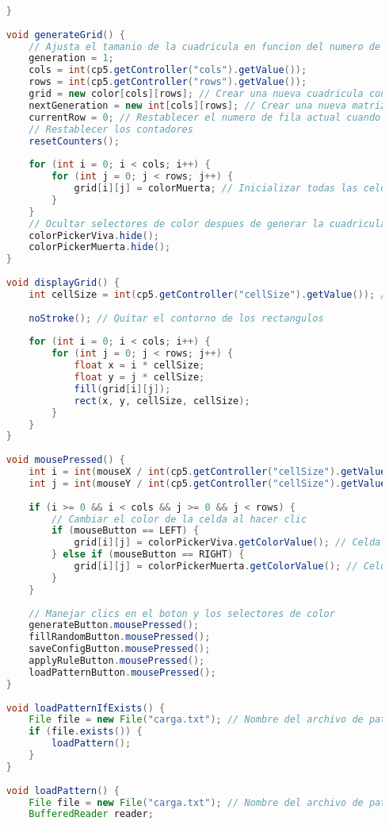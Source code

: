 \documentclass{article}
\begin{document}
\begin{lstlisting}[language=Java, basicstyle=\tiny, breaklines=true, breakatwhitespace=true]
		
	}
	
	void generateGrid() {
		// Ajusta el tamanio de la cuadricula en funcion del numero de celdas por lado (filas y columnas)
		generation = 1;
		cols = int(cp5.getController("cols").getValue());
		rows = int(cp5.getController("rows").getValue());
		grid = new color[cols][rows]; // Crear una nueva cuadricula con el tamanio actualizado
		nextGeneration = new int[cols][rows]; // Crear una nueva matriz para la siguiente generacion
		currentRow = 0; // Restablecer el numero de fila actual cuando se genera una nueva cuadricula
		// Restablecer los contadores
		resetCounters();
		
		for (int i = 0; i < cols; i++) {
			for (int j = 0; j < rows; j++) {
				grid[i][j] = colorMuerta; // Inicializar todas las celdas como muertas
			}
		}
		// Ocultar selectores de color despues de generar la cuadricula
		colorPickerViva.hide();
		colorPickerMuerta.hide();
	}
	
	void displayGrid() {
		int cellSize = int(cp5.getController("cellSize").getValue()); // Obtener el tamanio de celda actual
		
		noStroke(); // Quitar el contorno de los rectangulos
		
		for (int i = 0; i < cols; i++) {
			for (int j = 0; j < rows; j++) {
				float x = i * cellSize;
				float y = j * cellSize;
				fill(grid[i][j]);
				rect(x, y, cellSize, cellSize);
			}
		}
	}
	
	void mousePressed() {
		int i = int(mouseX / int(cp5.getController("cellSize").getValue()));
		int j = int(mouseY / int(cp5.getController("cellSize").getValue()));
		
		if (i >= 0 && i < cols && j >= 0 && j < rows) {
			// Cambiar el color de la celda al hacer clic
			if (mouseButton == LEFT) {
				grid[i][j] = colorPickerViva.getColorValue(); // Celda viva
			} else if (mouseButton == RIGHT) {
				grid[i][j] = colorPickerMuerta.getColorValue(); // Celda muerta
			}
		}
		
		// Manejar clics en el boton y los selectores de color
		generateButton.mousePressed();
		fillRandomButton.mousePressed();
		saveConfigButton.mousePressed();
		applyRuleButton.mousePressed();
		loadPatternButton.mousePressed();
	}
	
	void loadPatternIfExists() {
		File file = new File("carga.txt"); // Nombre del archivo de patron
		if (file.exists()) {
			loadPattern();
		}
	}
	
	void loadPattern() {
		File file = new File("carga.txt"); // Nombre del archivo de patron
		BufferedReader reader;
		

\end{lstlisting}
\end{document}
